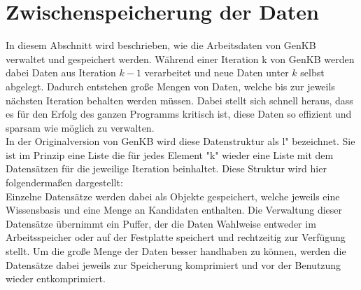 \documentclass[12pt,a4paper]{article}
\begin{document}
\section{Zwischenspeicherung der Daten}
In diesem Abschnitt wird beschrieben, wie die Arbeitsdaten von GenKB verwaltet und gespeichert werden. Während einer Iteration k von GenKB werden dabei Daten aus Iteration $ k - 1$ verarbeitet und neue Daten unter $k$ selbst abgelegt. Dadurch entstehen große Mengen von Daten, welche bis zur jeweils nächsten Iteration behalten werden müssen. Dabei stellt sich schnell heraus, dass es für den Erfolg des ganzen Programms kritisch ist, diese Daten so effizient und sparsam wie möglich zu verwalten. \\
In der Originalversion von GenKB wird diese Datenstruktur als \glqq l" \space bezeichnet. Sie ist im Prinzip eine Liste die für jedes Element "k" wieder eine Liste mit dem Datensätzen für die jeweilige Iteration beinhaltet. Diese Struktur wird hier folgendermaßen dargestellt: \\
Einzelne Datensätze werden dabei als Objekte gespeichert, welche jeweils eine Wissensbasis und eine Menge an Kandidaten enthalten. Die Verwaltung dieser Datensätze übernimmt ein Puffer, der die Daten Wahlweise entweder im Arbeitsspeicher oder auf der Festplatte speichert und rechtzeitig zur Verfügung stellt. Um die große Menge der Daten besser handhaben zu können, werden die Datensätze dabei jeweils zur Speicherung komprimiert und vor der Benutzung wieder entkomprimiert.
\end{document}
